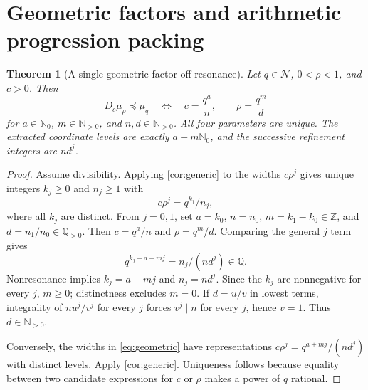 \documentclass[11pt,letterpaper]{article}
\newtheorem{theorem}{Theorem}[section]
\theoremstyle{definition}
\theoremstyle{remark}
\newcommand{\N}{\mathbb N_0}
\newcommand{\Np}{\mathbb N_{>0}}
\newcommand{\Q}{\mathbb Q}
\newcommand{\Z}{\mathbb Z}
\newcommand{\NR}{\mathcal N}
\numberwithin{equation}{section}
\begin{document}
\section{Geometric factors and arithmetic progression packing}\label{sec:streams}
\begin{theorem}[A single geometric factor off resonance]\label{thm:geometric}
Let $q\in\NR$, $0<\rho<1$, and $c>0$. Then
\begin{equation}\label{eq:geometric}
 D_c\mu_\rho\preceq\mu_q
 \quad\Longleftrightarrow\quad
 c=\frac{q^a}{n},\qquad \rho=\frac{q^m}{d}
\end{equation}
for $a\in\N$, $m\in\Np$, and $n,d\in\Np$. All four parameters are unique. The extracted coordinate levels are exactly $a+m\N$, and the successive refinement integers are $nd^j$.
\end{theorem}
\begin{proof}
Assume divisibility. Applying \cref{cor:generic} to the widths $c\rho^j$ gives unique integers $k_j\ge0$ and $n_j\ge1$ with
\[
 c\rho^j=q^{k_j}/n_j,
\]
where all $k_j$ are distinct. From $j=0,1$, set $a=k_0$, $n=n_0$, $m=k_1-k_0\in\Z$, and $d=n_1/n_0\in\Q_{>0}$. Then $c=q^a/n$ and $\rho=q^m/d$. Comparing the general $j$ term gives
\[
 q^{k_j-a-mj}=n_j/(nd^j)\in\Q.
\]
Nonresonance implies $k_j=a+mj$ and $n_j=nd^j$. Since the $k_j$ are nonnegative for every $j$, $m\ge0$; distinctness excludes $m=0$. If $d=u/v$ in lowest terms, integrality of $nu^j/v^j$ for every $j$ forces $v^j\mid n$ for every $j$, hence $v=1$. Thus $d\in\Np$.

Conversely, the widths in \eqref{eq:geometric} have representations
$c\rho^j=q^{a+mj}/(nd^j)$ with distinct levels. Apply \cref{cor:generic}. Uniqueness follows because equality between two candidate expressions for $c$ or $\rho$ makes a power of $q$ rational.
\end{proof}
\end{document}
